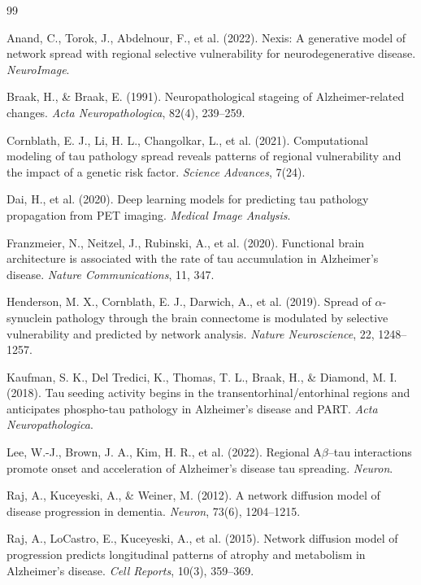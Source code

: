 \documentclass{article}
\begin{document}
\begin{thebibliography}{99}

Anand, C., Torok, J., Abdelnour, F., et al. (2022).
Nexis: A generative model of network spread with regional selective vulnerability for neurodegenerative disease.
\textit{NeuroImage}.

Braak, H., \& Braak, E. (1991).
Neuropathological stageing of Alzheimer-related changes.
\textit{Acta Neuropathologica}, 82(4), 239--259.

Cornblath, E. J., Li, H. L., Changolkar, L., et al. (2021).
Computational modeling of tau pathology spread reveals patterns of regional vulnerability and the impact of a genetic risk factor.
\textit{Science Advances}, 7(24).

Dai, H., et al. (2020).
Deep learning models for predicting tau pathology propagation from PET imaging.
\textit{Medical Image Analysis}.

Franzmeier, N., Neitzel, J., Rubinski, A., et al. (2020).
Functional brain architecture is associated with the rate of tau accumulation in Alzheimer's disease.
\textit{Nature Communications}, 11, 347.

Henderson, M. X., Cornblath, E. J., Darwich, A., et al. (2019).
Spread of $\alpha$-synuclein pathology through the brain connectome is modulated by selective vulnerability and predicted by network analysis.
\textit{Nature Neuroscience}, 22, 1248--1257.

Kaufman, S. K., Del Tredici, K., Thomas, T. L., Braak, H., \& Diamond, M. I. (2018).
Tau seeding activity begins in the transentorhinal/entorhinal regions and anticipates phospho-tau pathology in Alzheimer's disease and PART.
\textit{Acta Neuropathologica}.

Lee, W.-J., Brown, J. A., Kim, H. R., et al. (2022).
Regional A$\beta$--tau interactions promote onset and acceleration of Alzheimer's disease tau spreading.
\textit{Neuron}.

Raj, A., Kuceyeski, A., \& Weiner, M. (2012).
A network diffusion model of disease progression in dementia.
\textit{Neuron}, 73(6), 1204--1215.

Raj, A., LoCastro, E., Kuceyeski, A., et al. (2015).
Network diffusion model of progression predicts longitudinal patterns of atrophy and metabolism in Alzheimer's disease.
\textit{Cell Reports}, 10(3), 359--369.


\end{thebibliography}
\end{document}
